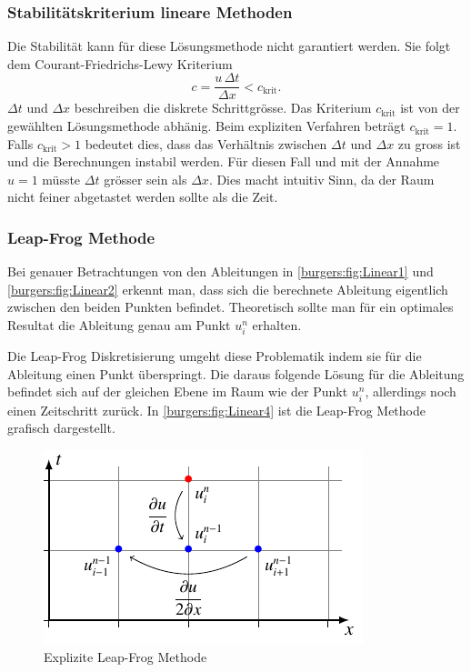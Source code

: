\subsubsection{Stabilit\"atskriterium lineare Methoden}
	Die Stabilit\"at kann f\"ur diese L\"osungsmethode nicht garantiert werden.
	Sie folgt dem Courant-Friedrichs-Lewy Kriterium
	\begin{equation}
		  c = \frac{u \, \Delta t}{\Delta x} < c_{\text{krit}}.
	\end{equation}
	$ \Delta t$ und $\Delta x$  beschreiben die diskrete Schrittgr\"osse.
	Das Kriterium $c_{\text{krit}}$ ist von der gew\"ahlten L\"osungsmethode abh\"anig.
	Beim expliziten Verfahren beträgt $c_{\text{krit}} = 1$.
	Falls $c_{\text{krit}} > 1$ bedeutet dies, dass das Verh\"altnis zwischen $ \Delta t$ und $\Delta x$ zu gross ist und die Berechnungen instabil werden.
	F\"ur diesen Fall und mit der Annahme $u = 1$ m\"usste $ \Delta t$ gr\"osser sein als $\Delta x$.
	Dies macht intuitiv Sinn, da der Raum nicht feiner abgetastet werden sollte als die Zeit.



\subsubsection{Leap-Frog Methode}

	Bei genauer Betrachtungen von den Ableitungen in \autoref{burgers:fig:Linear1} und \autoref{burgers:fig:Linear2} erkennt man, dass sich die berechnete Ableitung eigentlich zwischen den beiden Punkten befindet.
	Theoretisch sollte man für ein optimales Resultat die Ableitung genau am Punkt $u_{i}^{n}$ erhalten.

	\medskip
	Die Leap-Frog Diskretisierung umgeht diese Problematik indem sie f\"ur die Ableitung einen Punkt \"uberspringt.
	Die daraus folgende L\"osung für die Ableitung befindet sich auf der gleichen Ebene im Raum wie der Punkt $u_{i}^{n}$, allerdings noch einen Zeitschritt zurück.
	In \autoref{burgers:fig:Linear4} ist die Leap-Frog Methode grafisch dargestellt.

	     \begin{figure}
		\centering
		\includegraphics[height=.4\textwidth]{papers/burgers/BurgersEquation/tikz/linear4/linear4.pdf}
		\caption{Explizite Leap-Frog Methode}
		\label{burgers:fig:Linear4}
		\end{figure}

